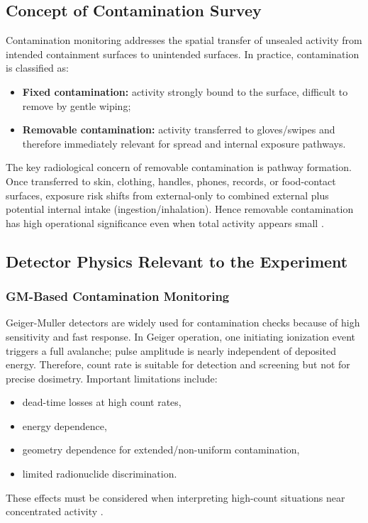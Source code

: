 \subsection{Concept of Contamination Survey}
Contamination monitoring addresses the spatial transfer of unsealed activity from intended containment surfaces to unintended surfaces. In practice, contamination is classified as:
\begin{itemize}
    \item \textbf{Fixed contamination:} activity strongly bound to the surface, difficult to remove by gentle wiping;
    \item \textbf{Removable contamination:} activity transferred to gloves/swipes and therefore immediately relevant for spread and internal exposure pathways.
\end{itemize}

The key radiological concern of removable contamination is pathway formation. Once transferred to skin, clothing, handles, phones, records, or food-contact surfaces, exposure risk shifts from external-only to combined external plus potential internal intake (ingestion/inhalation). Hence removable contamination has high operational significance even when total activity appears small \cite{cherry2012physics,iaea_ssg46}.

\subsection{Detector Physics Relevant to the Experiment}
\subsubsection{GM-Based Contamination Monitoring}
Geiger-Muller detectors are widely used for contamination checks because of high sensitivity and fast response. In Geiger operation, one initiating ionization event triggers a full avalanche; pulse amplitude is nearly independent of deposited energy. Therefore, count rate is suitable for detection and screening but not for precise dosimetry. Important limitations include:
\begin{itemize}
    \item dead-time losses at high count rates,
    \item energy dependence,
    \item geometry dependence for extended/non-uniform contamination,
    \item limited radionuclide discrimination.
\end{itemize}
These effects must be considered when interpreting high-count situations near concentrated activity \cite{knoll2010radiation}.

